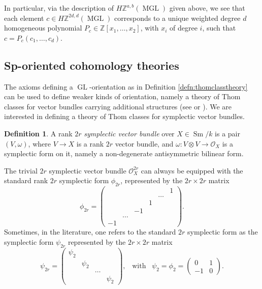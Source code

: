 \documentclass[10pt]{amsart}
\theoremstyle{definition}
\newtheorem{defn}{Definition}[section]
\theoremstyle{plain}
\numberwithin{equation}{section}
\newcommand{\0}{\emptyset}
\newcommand{\Z}{{\mathbb Z}}
\newcommand{\MGL}{{\operatorname{MGL}}}
\newcommand{\GL}{{\operatorname{GL}}}
\newcommand{\Sm}{{\operatorname{Sm}}}
\begin{document}
In particular, via the description of $H\Z^{a,b}(\MGL)$ given above, we see that each element $c \in H\Z^{2d,d}(\MGL)$ corresponds to a unique weighted degree $d$ homogeneous polynomial $P_c \in \Z[x_1, \ldots, x_2]$, with $x_i$ of degree $i$, such that $c=P_c(c_1,\ldots, c_d)$.

\subsection{Sp-oriented cohomology theories}

The axioms defining a $\GL$-orientation as in Definition \ref{defn:thomclasstheory} can be used to define weaker kinds of orientation, namely a theory of Thom classes for vector bundles carrying additional structures (see \cite[Section 3]{Ana:Slor} or \cite[Section 2]{DegFas:Borel}). We are interested in defining a theory of Thom classes for symplectic vector bundles.
\begin{defn}
\label{defn:sympl.bundles}
    A rank $2r$ \emph{symplectic vector bundle} over $X \in \Sm/k$ is a pair $(V,\omega)$, where $V \to X$ is a rank $2r$ vector bundle, and $\omega: V \otimes V \to \mathcal{O}_X$ is a symplectic form on it, namely a non-degenerate antisymmetric bilinear form.
\end{defn}

The trivial $2r$ symplectic vector bundle $\mathcal{O}_X^{2r}$ can always be equipped with the standard rank $2r$ symplectic form $\phi_{2r}$, represented by the $2r \times 2r$ matrix
$$\phi_{2r} =
\begin{pmatrix}
     & & &  &  & 1\\
     & &  &  &\ldots & \\
     & & & 1& &\\
     & & -1 &  & &  \\
     & \ldots &  & & & \\
     -1 & & & & &
\end{pmatrix}.$$
Sometimes, in the literature, one refers to the standard $2r$ symplectic form as the symplectic form $\psi_{2r}$ represented by the $2r \times 2r$ matrix
$$\psi_{2r} =
\begin{pmatrix}
     \psi_2& & &\\
     & \psi_2 &  & \\
     & & \ldots &\\
     & & & \psi_2
\end{pmatrix}, \; \; \; \text{with} \; \; \; \psi_2=\phi_2 =
\begin{pmatrix}
    0 & 1 \\
    -1 & 0
\end{pmatrix}.$$
\end{document}
